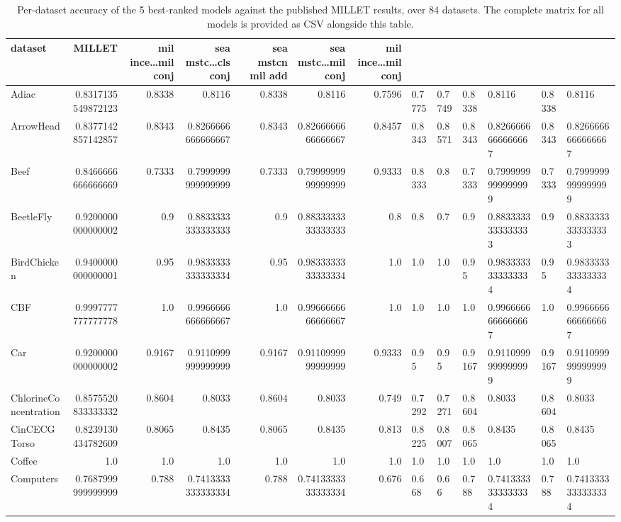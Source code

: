 \begin{table}[t]
\centering
\small
\caption{Per-dataset accuracy of the 5 best-ranked models against the published MILLET results, over 84 datasets. The complete matrix for all models is provided as CSV alongside this table.}
\label{tab:per_dataset}
\begin{tabular}{lrrrrrr}
\toprule
dataset & MILLET & mil ince\dots{}mil conj & sea mstc\dots{}cls conj & sea mstcn  mil add & sea mstc\dots{}mil conj & mil ince\dots{}mil conj \\
\midrule
Adiac & 0.8317135549872123 & 0.8338 & 0.8116 & 0.8338 & 0.8116 & 0.7596 & 0.7775 & 0.7749 & 0.8338 & 0.8116 & 0.8338 & 0.8116 \\
ArrowHead & 0.8377142857142857 & 0.8343 & 0.8266666666666667 & 0.8343 & 0.8266666666666667 & 0.8457 & 0.8343 & 0.8571 & 0.8343 & 0.8266666666666667 & 0.8343 & 0.8266666666666667 \\
Beef & 0.8466666666666669 & 0.7333 & 0.7999999999999999 & 0.7333 & 0.7999999999999999 & 0.9333 & 0.8333 & 0.8 & 0.7333 & 0.7999999999999999 & 0.7333 & 0.7999999999999999 \\
BeetleFly & 0.9200000000000002 & 0.9 & 0.8833333333333333 & 0.9 & 0.8833333333333333 & 0.8 & 0.8 & 0.7 & 0.9 & 0.8833333333333333 & 0.9 & 0.8833333333333333 \\
BirdChicken & 0.9400000000000001 & 0.95 & 0.9833333333333334 & 0.95 & 0.9833333333333334 & 1.0 & 1.0 & 1.0 & 0.95 & 0.9833333333333334 & 0.95 & 0.9833333333333334 \\
CBF & 0.9997777777777778 & 1.0 & 0.9966666666666667 & 1.0 & 0.9966666666666667 & 1.0 & 1.0 & 1.0 & 1.0 & 0.9966666666666667 & 1.0 & 0.9966666666666667 \\
Car & 0.9200000000000002 & 0.9167 & 0.9110999999999999 & 0.9167 & 0.9110999999999999 & 0.9333 & 0.95 & 0.95 & 0.9167 & 0.9110999999999999 & 0.9167 & 0.9110999999999999 \\
ChlorineConcentration & 0.8575520833333332 & 0.8604 & 0.8033 & 0.8604 & 0.8033 & 0.749 & 0.7292 & 0.7271 & 0.8604 & 0.8033 & 0.8604 & 0.8033 \\
CinCECGTorso & 0.8239130434782609 & 0.8065 & 0.8435 & 0.8065 & 0.8435 & 0.813 & 0.8225 & 0.8007 & 0.8065 & 0.8435 & 0.8065 & 0.8435 \\
Coffee & 1.0 & 1.0 & 1.0 & 1.0 & 1.0 & 1.0 & 1.0 & 1.0 & 1.0 & 1.0 & 1.0 & 1.0 \\
Computers & 0.7687999999999999 & 0.788 & 0.7413333333333334 & 0.788 & 0.7413333333333334 & 0.676 & 0.668 & 0.66 & 0.788 & 0.7413333333333334 & 0.788 & 0.7413333333333334 \\

\end{tabular}
\end{table}
